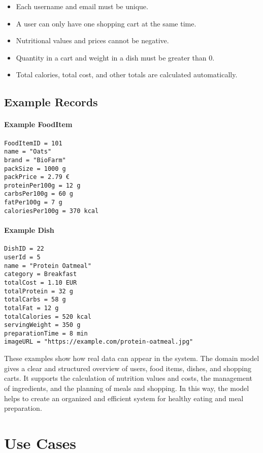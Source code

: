 \documentclass[11pt]{article}
\begin{document}
\begin{itemize}
    \item Each username and email must be unique.
    \item A user can only have one shopping cart at the same time.
    \item Nutritional values and prices cannot be negative.
    \item Quantity in a cart and weight in a dish must be greater than 0.
    \item Total calories, total cost, and other totals are calculated automatically.
\end{itemize}

\subsection*{Example Records}

\paragraph{Example FoodItem}
\begin{verbatim}
FoodItemID = 101
name = "Oats"
brand = "BioFarm"
packSize = 1000 g
packPrice = 2.79 €
proteinPer100g = 12 g
carbsPer100g = 60 g
fatPer100g = 7 g
caloriesPer100g = 370 kcal
\end{verbatim}

\paragraph{Example Dish}
\begin{verbatim}
DishID = 22
userId = 5
name = "Protein Oatmeal"
category = Breakfast
totalCost = 1.10 EUR
totalProtein = 32 g
totalCarbs = 58 g
totalFat = 12 g
totalCalories = 520 kcal
servingWeight = 350 g
preparationTime = 8 min
imageURL = "https://example.com/protein-oatmeal.jpg"
\end{verbatim}

These examples show how real data can appear in the system.
The domain model gives a clear and structured overview of users, food items, dishes, and shopping carts.
It supports the calculation of nutrition values and costs, the management of ingredients, and the planning of meals and shopping.
In this way, the model helps to create an organized and efficient system for healthy eating and meal preparation.

\section{Use Cases}
\end{document}

